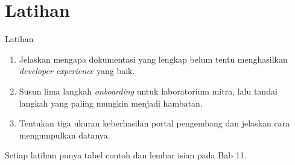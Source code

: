 \documentclass[aspectratio=169, table, 12pt]{beamer}
\begin{document}
\section{Latihan}

\begin{frame}{{\Large Latihan}}
  \vspace{8pt}
  \begin{enumerate}
    \item Jelaskan mengapa dokumentasi yang lengkap belum tentu menghasilkan \textit{developer experience} yang baik.
    \item Susun lima langkah \textit{onboarding} untuk laboratorium mitra, lalu tandai langkah yang paling mungkin menjadi hambatan.
    \item Tentukan tiga ukuran keberhasilan portal pengembang dan jelaskan cara mengumpulkan datanya.
  \end{enumerate}
  \vspace{8pt}
  {\small Setiap latihan punya tabel contoh dan lembar isian pada Bab 11.}
\end{frame}
\end{document}
